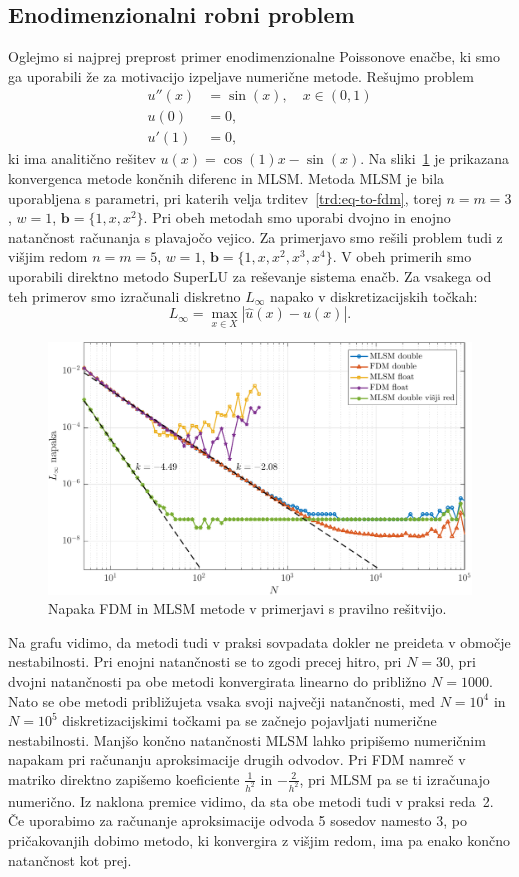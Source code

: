 \documentclass[12pt,a4paper,twoside]{article}
\theoremstyle{definition} %
\theoremstyle{plain} %
\numberwithin{equation}{section}
\renewcommand{\b}{\boldsymbol}
\newlength{\iw}
\begin{document}
\subsection{Enodimenzionalni robni problem}
Oglejmo si najprej preprost primer enodimenzionalne Poissonove enačbe, ki smo ga uporabili že za
motivacijo izpeljave numerične metode.
Rešujmo problem
\begin{align*}
  u''(x) &= \sin(x), \quad x \in (0, 1) \\
  u(0) &= 0, \\
  u'(1) &= 0,
\end{align*}
ki ima analitično rešitev $u(x) = \cos(1) x - \sin(x)$.
Na sliki~\ref{fig:mlsm-fdm-err} je prikazana konvergenca metode končnih diferenc
in MLSM. Metoda MLSM je bila uporabljena s parametri, pri katerih velja
trditev~\ref{trd:eq-to-fdm}, torej $n=m=3$, $w=1$, $\b b = \{1, x, x^2\}$.
Pri obeh metodah smo uporabi dvojno in enojno natančnost računanja s plavajočo
vejico.  Za primerjavo smo rešili problem tudi z višjim redom $n=m=5$, $w=1$,
$\b b = \{1, x, x^2, x^3, x^4\}$. V obeh primerih smo uporabili direktno metodo
SuperLU za reševanje sistema enačb. Za vsakega od teh primerov smo izračunali
diskretno $L_\infty$ napako v diskretizacijskih točkah: \[ L_\infty = \max_{x\in
X} |\hat{u}(x) - u(x)|.  \]

\begin{figure}[h]
  \centering
  \includegraphics[width=\iw]{images/lap1d_convergence.pdf}
  \caption{Napaka FDM in MLSM metode v primerjavi s pravilno rešitvijo.}
  \label{fig:mlsm-fdm-err}
\end{figure}

Na grafu vidimo, da metodi tudi v praksi sovpadata dokler ne preideta v območje nestabilnosti. Pri
enojni natančnosti se to zgodi precej hitro, pri $N = 30$, pri dvojni natančnosti pa obe metodi
konvergirata linearno do približno $N = 1000$.  Nato se obe metodi približujeta vsaka svoji največji
natančnosti, med $N = 10^4$ in $N = 10^5$ diskretizacijskimi točkami pa se začnejo pojavljati
numerične nestabilnosti. Manjšo končno natančnosti MLSM lahko pripišemo numeričnim napakam pri
računanju aproksimacije drugih odvodov. Pri FDM namreč v matriko direktno zapišemo koeficiente
$\frac{1}{h^2}$ in $-\frac{2}{h^2}$, pri MLSM pa se ti izračunajo numerično. Iz naklona premice
vidimo, da sta obe metodi tudi v praksi reda~2. Če uporabimo za računanje aproksimacije odvoda 5
sosedov namesto 3, po pričakovanjih dobimo metodo, ki konvergira z višjim redom, ima pa enako končno
natančnost kot prej.
\end{document}
